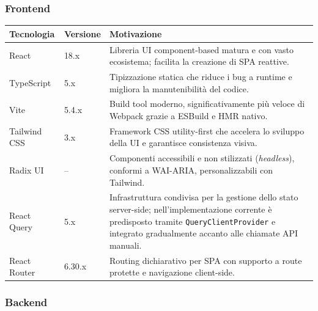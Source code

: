 ﻿\documentclass[a4paper,11pt]{article}
\begin{document}
\subsubsection{Frontend}

\begin{tabular}{|l|l|p{8cm}|}
\hline
\textbf{Tecnologia} & \textbf{Versione} & \textbf{Motivazione} \\
\hline
React & 18.x & Libreria UI component-based matura e con vasto ecosistema; facilita la creazione di SPA reattive. \\
\hline
TypeScript & 5.x & Tipizzazione statica che riduce i bug a runtime e migliora la manutenibilit\`a del codice. \\
\hline
Vite & 5.4.x & Build tool moderno, significativamente pi\`u veloce di Webpack grazie a ESBuild e HMR nativo. \\
\hline
Tailwind CSS & 3.x & Framework CSS utility-first che accelera lo sviluppo della UI e garantisce consistenza visiva. \\
\hline
Radix UI & -- & Componenti accessibili e non stilizzati (\emph{headless}), conformi a WAI-ARIA, personalizzabili con Tailwind. \\
\hline
React Query & 5.x & Infrastruttura condivisa per la gestione dello stato server-side; nell'implementazione corrente \`e predisposto tramite \texttt{QueryClientProvider} e integrato gradualmente accanto alle chiamate API manuali. \\
\hline
React Router & 6.30.x & Routing dichiarativo per SPA con supporto a route protette e navigazione client-side. \\
\hline
\end{tabular}

\subsubsection{Backend}
\end{document}
